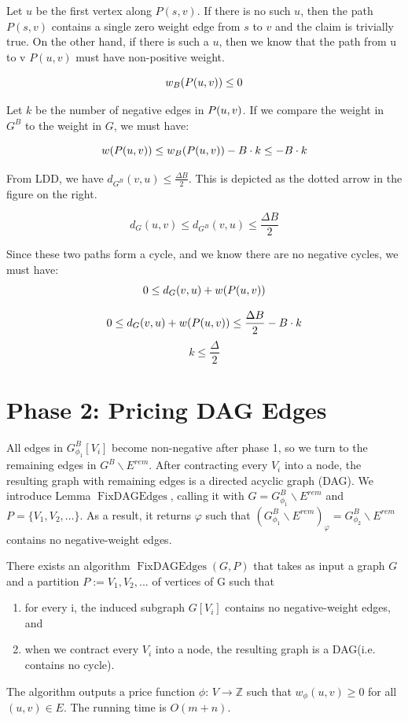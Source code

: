 \documentclass[11pt]{article}
\newcommand{\FixAlmostDag}{\operatorname{FixDAGEdges}}
\newcommand{\esep}{E^{rem}}
\newcommand{\GB}{G^{B}}
\begin{document}
Let $u$ be the first vertex along $P(s,v)$. If there is no such $u$, then the path $P(s,v)$ contains a single zero weight edge from $s$ to $v$ and the claim is trivially true. On the other hand, if there is such a $u$, then we know that the path from u to v $P(u,v)$ must have non-positive weight.

$$w_B(\textcolor{black}{P(u,v)}) \leq 0$$

Let $k$ be the number of negative edges in $\textcolor{black}{P(u,v)}$. If we compare the weight in $\GB$ to the weight in $G$, we must have: 

$$w(\textcolor{black}{P(u,v)}) \leq w_B(\textcolor{black}{P(u,v)}) -B \cdot k \leq  -B \cdot k$$

From LDD, we have $d_{\GB} (v, u) \leq  \frac{\Delta B}{2}$. This is depicted as the dotted arrow in the figure on the right.

    $$d_G(u,v) \leq d_{\GB} (v, u) \leq  \frac{\Delta B}{2}$$

Since these two paths form a cycle, and we know there are no negative cycles, we must have:
    $$0 \leq d_G(v,u) + w(\textcolor{black}{P(u,v)})$$

    $$0 \leq d_G(v,u) + w(\textcolor{black}{P(u,v)}) \leq  \frac{\Delta B}{2} -B \cdot k$$
$$k \leq \frac{\Delta}{2} $$





    
\section{Phase 2: Pricing DAG Edges}
All edges in $G^B_{\phi_1}[V_i]$ become non-negative after phase 1, so we turn to the remaining edges in $G^B \backslash \esep$. After contracting every $V_i$ into a node, the resulting graph with remaining edges is a directed acyclic graph (DAG). We introduce Lemma $\FixAlmostDag$, calling it with $G=G^B_{\phi_1} \backslash \esep$ and $P = \{V_1, V_2, \dots\}$. As a result, it returns $\varphi$ such that $(G^B_{\phi_1} \backslash \esep)_\varphi = G^B_{\phi_2} \backslash \esep$ contains no negative-weight edges.

\begin{lemma}
There exists an algorithm $\FixAlmostDag(G, P)$ that takes as input a graph $G$ and a partition $P := {V_1, V_2, ...}$ of vertices of G such that
\begin{enumerate}
    \item for every i, the induced subgraph $G[V_i]$ contains no negative-weight edges, and
    \item when we contract every $V_i$ into a node, the resulting graph is a DAG(i.e. contains no cycle).
\end{enumerate}
The algorithm outputs a price function $\phi$: $V \to \mathbb{Z}$ such that $w_\phi(u, v) \ge 0$ for all $(u, v) \in E$. The running time is $O(m+n)$.
\end{lemma}
\end{document}
